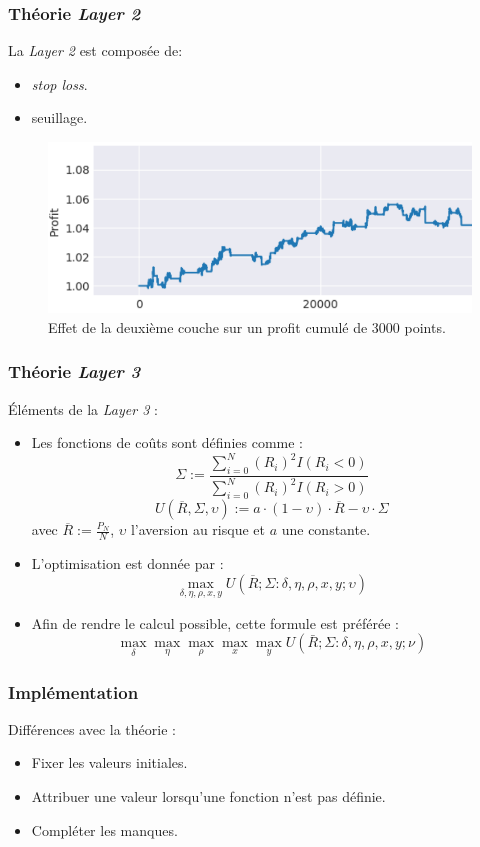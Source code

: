 \documentclass{beamer}
\begin{document}
	\begin{frame}
		\frametitle{Théorie \textit{Layer 2}}
		La \textit{Layer 2} est composée de:
		\begin{itemize}
			\item \textit{stop loss}.
			\item seuillage.
		\end{itemize}
		\begin{figure}
			\includegraphics[scale=0.4]{images/stop_loss}
			\caption{Effet de la deuxième couche sur un profit cumulé de 3000 points.}
		\end{figure}
	\end{frame}

	\begin{frame}
		\frametitle{Théorie \textit{Layer 3}}
		Éléments de la \textit{Layer 3} :
		\begin{itemize}
			\item Les fonctions de coûts sont définies comme : $$\Sigma := \frac{\sum_{i=0}^N (R_i)^2 I(R_i < 0)}{\sum_{i=0}^N (R_i)^2 I(R_i > 0)}$$
			$$ U(\overline{R},\Sigma,\upsilon) := a\cdot(1-\upsilon)\cdot \overline{R} - \upsilon \cdot \Sigma$$ avec $\overline{R} := \frac{P_N}{N}$, $\upsilon$ l'aversion au risque et $a$ une constante.
			\item L'optimisation est donnée par : $$\max_{\delta, \eta, \rho, x, y} U(\overline{R};\Sigma: \delta, \eta, \rho, x, y; \upsilon)$$
			\item Afin de rendre le calcul possible, cette formule est préférée : $$\max\limits_{\delta} \max\limits_{\eta} \max\limits_{\rho} \max\limits_{x} \max\limits_{y} U(\bar{R};\Sigma : \delta, \eta, \rho, x, y; \nu)$$
		\end{itemize}
	\end{frame}

	\begin{frame}
		\frametitle{Implémentation}
		Différences avec la théorie :
		\begin{itemize}
			\item Fixer les valeurs initiales.
			\item Attribuer une valeur lorsqu'une fonction n'est pas définie.
			\item Compléter les manques.
		\end{itemize}
	\end{frame}
\end{document}
